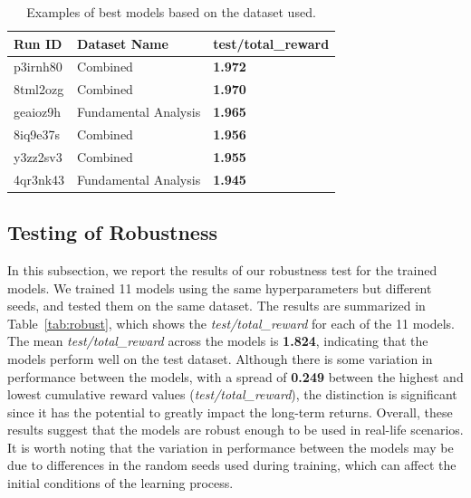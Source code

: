 \documentclass[../xlapes02]{subfiles}
\begin{document}
    \begin{table}
        \centering
        \label{tab:best-datasets}
        \begin{tabular}{|l|l|l|}
            \hline
            \textbf{Run ID} & \textbf{Dataset Name} & \textbf{test/total\_reward}                \\ \hline
            p3irnh80        & Combined              & \textcolor[RGB]{50,150,50}{\textbf{1.972}} \\ \hline
            8tml2ozg        & Combined              & \textcolor[RGB]{50,150,50}{\textbf{1.970}} \\ \hline
            geaioz9h        & Fundamental Analysis  & \textcolor[RGB]{50,150,50}{\textbf{1.965}} \\ \hline
            8iq9e37s        & Combined              & \textcolor[RGB]{50,150,50}{\textbf{1.956}} \\ \hline
            y3zz2sv3        & Combined              & \textcolor[RGB]{50,150,50}{\textbf{1.955}} \\ \hline
            4qr3nk43        & Fundamental Analysis  & \textcolor[RGB]{50,150,50}{\textbf{1.945}} \\ \hline
        \end{tabular}
        \caption{Examples of best models based on the dataset used.}
    \end{table}

    \subsection{Testing of Robustness}\label{subsec:testing-of-robustness}
    In this subsection, we report the results of our robustness test for the trained models. We trained 11 models using the same hyperparameters but different seeds, and tested them on the same dataset. The results are summarized in Table~\cref{tab:robust}, which shows the \emph{test/total\_reward} for each of the 11 models. The mean \emph{test/total\_reward} across the models is \textbf{1.824}, indicating that the models perform well on the test dataset. Although there is some variation in performance between the models, with a spread of \textbf{0.249} between the highest and lowest cumulative reward values (\emph{test/total\_reward}), the distinction is significant since it has the potential to greatly impact the long-term returns. Overall, these results suggest that the models are robust enough to be used in real-life scenarios. It is worth noting that the variation in performance between the models may be due to differences in the random seeds used during training, which can affect the initial conditions of the learning process.
\end{document}
